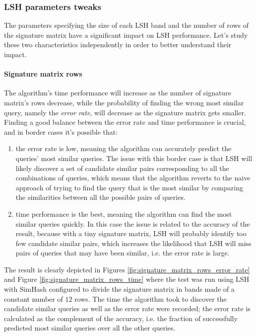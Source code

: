 \subsubsection{LSH parameters tweaks} 
The parameters specifying the size of each LSH band and the number of rows of the signature matrix have a significant impact on LSH performance. Let's study these two characteristics independently in order to better understand their impact. 

\paragraph{Signature matrix rows} The algorithm's time performance will increase as the number of signature matrix's rows decrease, while the probability of finding the wrong most similar query, namely the \emph{error rate}, will decrease as the signature matrix gets smaller. Finding a good balance between the error rate and time performance is crucial, and in border cases it's possible that:
\begin{enumerate}
    \item the error rate is low, meaning the algorithm can accurately predict the queries' most similar queries. The issue with this border case is that LSH will likely discover a set of candidate similar pairs corresponding to all the combinations of queries, which means that the algorithm reverts to the naive approach of trying to find the query that is the most similar by comparing the similarities between all the possible pairs of queries. 
    \item time performance is the best, meaning the algorithm can find the most similar queries quickly. In this case the issue is related to the accuracy of the result, because with a tiny signature matrix, LSH will probably identify too few candidate similar pairs, which increases the likelihood that LSH will miss pairs of queries that may have been similar, i.e. the error rate is large.
\end{enumerate}

The result is clearly depicted in Figures \ref{fig:signature_matrix_rows_error_rate} and Figure \ref{fig:signature_matrix_rows_time} where the test was run using LSH with SimHash configured to divide the signature matrix in bands made of a constant number of $12$ rows. The time the algorithm took to discover the candidate similar queries as well as the error rate were recorded; the error rate is calculated as the complement of the accuracy, i.e. the fraction of successfully predicted most similar queries over all the other queries. 

